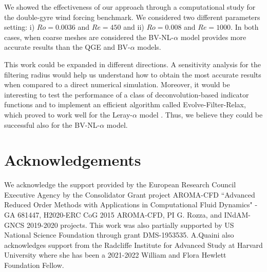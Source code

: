 \documentclass[11pt,a4paper]{article}
\begin{document}
We showed the effectiveness of our approach through a computational study for the double-gyre wind forcing benchmark. 
We considered two different parameters setting: i) $Ro = 0.0036$ and $Re = 450$ and ii) $Ro = 0.008$ and $Re = 1000$. 
In both cases, when coarse meshes are considered the BV-NL-$\alpha$ model provides more accurate results than 
the QGE and BV-$\alpha$ models.

This work could be expanded in different directions. A sensitivity analysis for the filtering radius \cite{Bertagna2019}
would help us understand how to obtain the most accurate results when compared to a direct
numerical simulation. Moreover, it would be interesting to test the performance of a class of deconvolution-based 
indicator functions and to implement an efficient algorithm called Evolve-Filter-Relax, 
which proved to work well for the Leray-$\alpha$ model \cite{BQV, Girfoglio2019, Girfoglio2021a, Girfoglio2021b, Girfoglio2021c, Girfoglio_JCP, Strazzullo2021}. %
Thus, we believe they could be successful also for the BV-NL-$\alpha$ model. 




\section{Acknowledgements}\label{sec:acknowledgements}
We acknowledge the support provided by the European Research Council Executive Agency by the Consolidator Grant project AROMA-CFD ``Advanced Reduced Order Methods with Applications in Computational Fluid Dynamics" - GA 681447, H2020-ERC CoG 2015 AROMA-CFD, PI G. Rozza, and INdAM-GNCS 2019-2020 projects.
This work was also partially supported by US National Science Foundation through grant DMS-1953535. 
A.Quaini also acknowledges support from the Radcliffe Institute for Advanced Study at Harvard University where
she has been a 2021-2022 William and Flora Hewlett Foundation Fellow.
\end{document}
